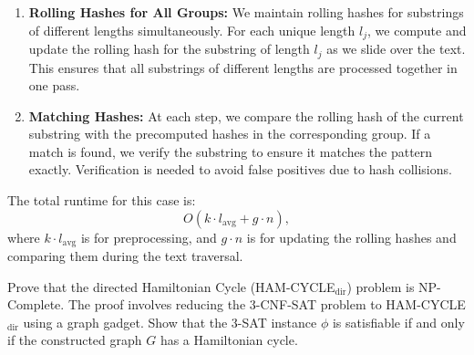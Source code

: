 \documentclass[10pt,letter,notitlepage]{article}
\newcounter{exercise}
\begin{document}
\begin{Answer}[]
\begin{enumerate}
    \item \textbf{Rolling Hashes for All Groups:} We maintain rolling hashes for substrings of different lengths simultaneously. For each unique length \(l_j\), we compute and update the rolling hash for the substring of length \(l_j\) as we slide over the text. This ensures that all substrings of different lengths are processed together in one pass.

    \item \textbf{Matching Hashes:} At each step, we compare the rolling hash of the current substring with the precomputed hashes in the corresponding group. If a match is found, we verify the substring to ensure it matches the pattern exactly. Verification is needed to avoid false positives due to hash collisions.
\end{enumerate}

The total runtime for this case is:
\[
O(k \cdot l_{\text{avg}} + g \cdot n),
\]
where \(k \cdot l_{\text{avg}}\) is for preprocessing, and \(g \cdot n\) is for updating the rolling hashes and comparing them during the text traversal.




\end{Answer}

\begin{exercise}[(20 marks)]

Prove that the directed Hamiltonian Cycle (HAM-CYCLE\(_{\text{dir}}\)) problem is NP-Complete. The proof involves reducing the 3-CNF-SAT problem to HAM-CYCLE\(_{\text{dir}}\) using a graph gadget. Show that the 3-SAT instance \(\phi\) is satisfiable if and only if the constructed graph \(G\) has a Hamiltonian cycle.


\end{exercise}
\end{document}
